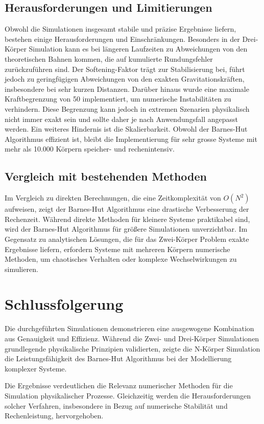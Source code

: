 \documentclass[a4paper,12pt,twoside]{article}
\begin{document}
\subsection{Herausforderungen und Limitierungen}
Obwohl die Simulationen insgesamt stabile und präzise Ergebnisse liefern, bestehen einige Herausforderungen und Einschränkungen. Besonders in der Drei-Körper Simulation kann es bei längeren Laufzeiten zu Abweichungen von den theoretischen Bahnen kommen, die auf kumulierte Rundungsfehler zurückzuführen sind. Der Softening-Faktor trägt zur Stabilisierung bei, führt jedoch zu geringfügigen Abweichungen von den exakten Gravitationskräften, insbesondere bei sehr kurzen Distanzen. Darüber hinaus wurde eine maximale Kraftbegrenzung von 50 implementiert, um numerische Instabilitäten zu verhindern. Diese Begrenzung kann jedoch in extremen Szenarien physikalisch nicht immer exakt sein und sollte daher je nach Anwendungsfall angepasst werden. Ein weiteres Hindernis ist die Skalierbarkeit. Obwohl der Barnes-Hut Algorithmus effizient ist, bleibt die Implementierung für sehr grosse Systeme mit mehr als 10.000 Körpern speicher- und rechenintensiv.

\subsection{Vergleich mit bestehenden Methoden}
Im Vergleich zu direkten Berechnungen, die eine Zeitkomplexität von \( O(N^2) \) aufweisen, zeigt der Barnes-Hut Algorithmus eine drastische Verbesserung der Rechenzeit. Während direkte Methoden für kleinere Systeme praktikabel sind, wird der Barnes-Hut Algorithmus für größere Simulationen unverzichtbar. Im Gegensatz zu analytischen Lösungen, die für das Zwei-Körper Problem exakte Ergebnisse liefern, erfordern Systeme mit mehreren Körpern numerische Methoden, um chaotisches Verhalten oder komplexe Wechselwirkungen zu simulieren.

\section{Schlussfolgerung}
Die durchgeführten Simulationen demonstrieren eine ausgewogene Kombination aus Genauigkeit und Effizienz. Während die Zwei- und Drei-Körper Simulationen grundlegende physikalische Prinzipien validierten, zeigte die N-Körper Simulation die Leistungsfähigkeit des Barnes-Hut Algorithmus bei der Modellierung komplexer Systeme.

Die Ergebnisse verdeutlichen die Relevanz numerischer Methoden für die Simulation physikalischer Prozesse. Gleichzeitig werden die Herausforderungen solcher Verfahren, insbesondere in Bezug auf numerische Stabilität und Rechenleistung, hervorgehoben.
\end{document}
